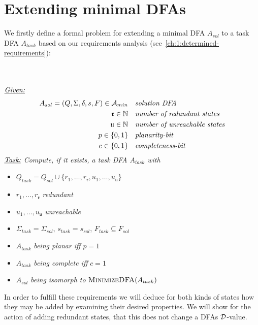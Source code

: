
\chapter{Extending minimal DFAs} \label{ch:3}

We firstly define a formal problem for extending a minimal DFA $A_{sol}$ to a task DFA $A_{task}$ based on our requirements analysis (see~\ref{ch:1:determined-requirements}):
\begin{definition}[ExtendMinimalDFA] $ $ \\
	$ $ \vspace{-0.4cm} \\
	\noindent $\underline{\emph{Given:}}$
	\vspace{-0.5cm}
	\begin{align*}
	A_{sol} = (Q, \Sigma, \delta, s, F) \in \mathcal{A}_{min}\ \ \ & \emph{solution DFA} \\
	\mathfrak{r} \in \mathbb{N}\ \ \ & \emph{number of redundant states} \\
	\mathfrak{u} \in \mathbb{N}\ \ \ & \emph{number of unreachable states} \\
	p \in \{0,1\}\ \ \ & \emph{planarity-bit} \\
	c \in \{0,1\}\ \ \ & \emph{completeness-bit}
	\end{align*}
	\noindent $\underline{\emph{Task:}}$ \emph{Compute, if it exists, a task DFA $A_{task}$ with}
	\begin{itemize}
		\item $Q_{task} = Q_{sol} \cup \{ r_1, \ldots, r_\mathfrak{r}, u_1, \ldots, u_\mathfrak{u} \}$
		\item $r_1, \ldots, r_\mathfrak{r}$ \emph{redundant}
		\item $u_1, \ldots, u_\mathfrak{u}$ \emph{unreachable}
		\item $\Sigma_{task} = \Sigma_{sol}$, $s_{task} = s_{sol}$, $F_{task} \subseteq F_{sol}$
		\item $A_{task}$ \emph{being planar iff} $p = 1$
		\item $A_{task}$ \emph{being complete iff} $c = 1$
		\item $A_{sol}$ \emph{being isomorph to} $\textsc{MinimizeDFA}(A_{task})$
	\end{itemize}
\end{definition}
\noindent In order to fulfill these requirements we will deduce for both kinds of states how they may be added by examining their desired properties. We will show for the action of adding redundant states, that this does not change a DFAs $\mathcal{D}$-value.

